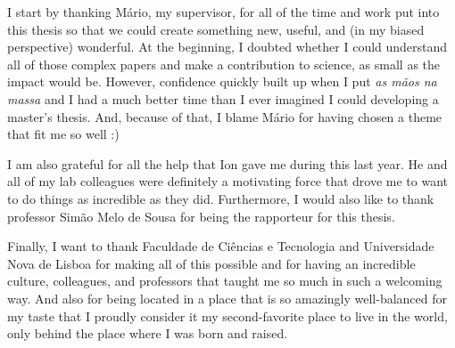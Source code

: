 
%

\begin{ntacknowledgements}

I start by thanking Mário, my supervisor, for all of the time and work put into this thesis so that we could create something new, useful, and (in my biased perspective) wonderful. 
At the beginning, I doubted whether I could understand all of those complex papers and make a contribution to science, as small as the impact would be.
However, confidence quickly built up when I put \emph{as mãos na massa} and I had a much better time than I ever imagined I could developing a master's thesis.
And, because of that, I blame Mário for having chosen a theme that fit me so well :)

I am also grateful for all the help that Ion gave me during this last year.
He and all of my lab colleagues were definitely a motivating force that drove me to want to do things as incredible as they did.
Furthermore, I would also like to thank professor Simão Melo de Sousa for being the rapporteur for this thesis.

Finally, I want to thank Faculdade de Ciências e Tecnologia and Universidade Nova de Lisboa for making all of this possible and for having an incredible culture, colleagues, and professors that taught me so much in such a welcoming way.
And also for being located in a place that is so amazingly well-balanced for my taste that I proudly consider it my second-favorite place to live in the world, only behind the place where I was born and raised.

\iffalse
Acknowledgments are personal text and should be a free expression of the author.
However, without any intention of conditioning the form or content of this text, I would like to add that it usually starts with academic thanks (instructors, etc.); then institutional thanks (Research Center, Department, Faculty, University, FCT / MEC scholarships, etc.) and, finally, the personal ones (friends, family, etc.).
But I insist that there are no fixed rules for this text, and it must, above all, express what the author feels.
\fi

\end{ntacknowledgements}

